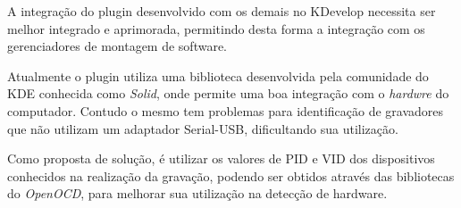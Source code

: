 A integração do plugin desenvolvido com os demais no KDevelop necessita ser melhor integrado e aprimorada, permitindo desta forma a integração com os gerenciadores de montagem de software.

Atualmente o plugin utiliza uma biblioteca desenvolvida pela comunidade do KDE conhecida como \textit{Solid}, onde permite uma boa integração com o \textit{hardwre} do computador. Contudo o mesmo tem problemas para identificação de gravadores que não utilizam um adaptador Serial-USB, dificultando sua utilização. 

Como proposta de solução, é utilizar os valores de PID e VID dos dispositivos conhecidos na realização da gravação, podendo ser obtidos através das bibliotecas do \textit{OpenOCD}, para melhorar sua utilização na detecção de hardware.

